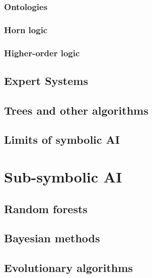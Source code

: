 \documentclass[12pt,a4paper,openright,twoside]{book}
\begin{document}
\subsubsection{Ontologies}\label{subsubsec:ontologies}

\subsubsection{Horn logic}\label{subsubsec:horn-logic}

\subsubsection{Higher-order logic}\label{subsubsec:higher-order-logic}

\subsection{Expert Systems}\label{subsec:expert-systems}

\subsection{Trees and other algorithms}\label{subsec:trees-and-other-algorithms}

\subsection{Limits of symbolic \ac{AI}}\label{subsec:limits-of-symbolic-ai}

\section{Sub-symbolic \ac{AI}}\label{sec:sub-symbolic-ai}

\subsection{Random forests}\label{subsec:random-forests}

\subsection{Bayesian methods}\label{subsec:bayesian-methods}

\subsection{Evolutionary algorithms}\label{subsec:evolutionary-algorithms}
\end{document}
